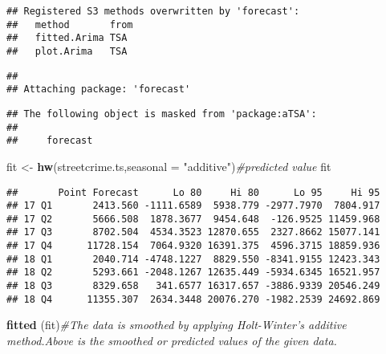\documentclass[]{article}
\newenvironment{Shaded}{\begin{snugshade}}{\end{snugshade}}
\newcommand{\CommentTok}[1]{\textcolor[rgb]{0.56,0.35,0.01}{\textit{#1}}}
\newcommand{\DataTypeTok}[1]{\textcolor[rgb]{0.13,0.29,0.53}{#1}}
\newcommand{\KeywordTok}[1]{\textcolor[rgb]{0.13,0.29,0.53}{\textbf{#1}}}
\newcommand{\NormalTok}[1]{#1}
\newcommand{\StringTok}[1]{\textcolor[rgb]{0.31,0.60,0.02}{#1}}
\begin{document}
\begin{Shaded}
\end{Shaded}

\begin{verbatim}
## Registered S3 methods overwritten by 'forecast':
##   method       from
##   fitted.Arima TSA 
##   plot.Arima   TSA
\end{verbatim}

\begin{verbatim}
## 
## Attaching package: 'forecast'
\end{verbatim}

\begin{verbatim}
## The following object is masked from 'package:aTSA':
## 
##     forecast
\end{verbatim}

\begin{Shaded}
\begin{Highlighting}[]
\NormalTok{fit <-}\StringTok{ }\KeywordTok{hw}\NormalTok{(streetcrime.ts,}\DataTypeTok{seasonal =} \StringTok{"additive"}\NormalTok{)}\CommentTok{#predicted value}
\NormalTok{fit}
\end{Highlighting}
\end{Shaded}

\begin{verbatim}
##       Point Forecast      Lo 80     Hi 80      Lo 95     Hi 95
## 17 Q1       2413.560 -1111.6589  5938.779 -2977.7970  7804.917
## 17 Q2       5666.508  1878.3677  9454.648  -126.9525 11459.968
## 17 Q3       8702.504  4534.3523 12870.655  2327.8662 15077.141
## 17 Q4      11728.154  7064.9320 16391.375  4596.3715 18859.936
## 18 Q1       2040.714 -4748.1227  8829.550 -8341.9155 12423.343
## 18 Q2       5293.661 -2048.1267 12635.449 -5934.6345 16521.957
## 18 Q3       8329.658   341.6577 16317.657 -3886.9339 20546.249
## 18 Q4      11355.307  2634.3448 20076.270 -1982.2539 24692.869
\end{verbatim}

\begin{Shaded}
\begin{Highlighting}[]
\KeywordTok{fitted}\NormalTok{ (fit)}\CommentTok{#The data is smoothed by applying Holt-Winter’s additive method.Above is the smoothed or predicted values of the given data.}
\end{Highlighting}
\end{Shaded}
\end{document}
